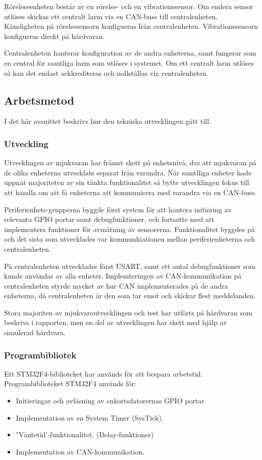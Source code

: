 \documentclass{article}
\begin{document}
Röreleseenheten består av en rörelse- och en vibrationssensor. Om endera sensor
utlöses skickas ett centralt larm via en CAN-buss till centralenheten. Känsligheten
på rörelsesensorn konfigueras från centralenheten. Vibrationssensorn konfigueras direkt på hårdvaran.

Centralenheten hanterar konfiguration av de andra enheterna, samt fungerar som en
central för samtliga larm som utlöses i systemet. Om ett centralt larm utlöses så
kan det endast ackkrediteras och nollställas via centralenheten.
\subsection{Arbetsmetod} %

I det här avsnittet beskrivs hur den tekniska utvecklingen gått till.


\subsubsection{Utveckling}

Utvecklingen av mjukvaran har främst skett på enhetsnivå, dvs att mjukvaran på de olika enheterna utvecklats separat från varandra. 
När samtlliga enheter hade uppnåt majoriteten av sin tänkta funktionalitet så bytte utvecklingen fokus till att handla om att få enheterna att kommunicera med varandra via en CAN-buss.

Periferienhets-grupperna byggde först system för att hantera initiering av relevanta GPIO portar samt debugfunktioner, och fortsatte med att implementera funktioner för avmätning av sensorerna. Funktionalitet byggdes på och det sista som utvecklades var kommunkiationen mellan periferienheterna och centralenheten.

På centralenheten utvecklades först USART, samt ett antal debugfunktioner som kunde användas av alla enheter. Implemteringen av CAN-kommunikation på centralenheten styrde mycket av hur CAN implementerades på de andra enheterna, då centralenheten är den som tar emot och skickar flest meddelanden.

Stora majoriten av mjukvaroutvecklingen och test har utförts på hårdvaran som beskrivs i rapporten, men en del av utvecklingen har skett med hjälp av simulerad hårdvara.

\subsubsection{Programbibliotek}
\label{stm}
Ett STM32F4-biblioteket har används för att bespara arbetstid.
Programbiblioteket STM32F4\cite{stm} används för:
\begin{itemize}
    \item Initieringar och avläsning av enkortsdatorernas GPIO portar.
    \item Implementation av en System Timer (SysTick).
    \item "Väntetid'-funktionalitet. (Delay-funktioner)
    \item Implementation av CAN-kommunikation.
\end{itemize}
\end{document}
